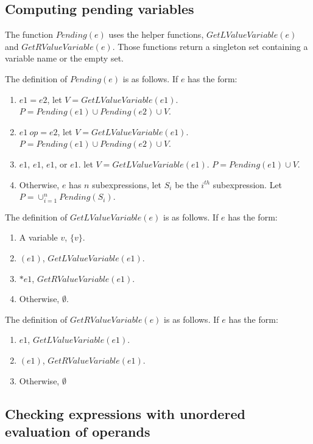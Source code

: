 \subsection{Computing pending variables}

The function $Pending(e)$ uses the helper functions,
$GetLValueVariable(e)$ and $GetRValueVariable(e)$.  Those functions
return a singleton set containing a variable name or the empty set.

The definition of $Pending(e)$ is as follows. If $e$ has the form:
\begin{enumerate}
\item $e1 = e2$, let $V = GetLValueVariable(e1)$.
$P = Pending(e1) \cup Pending(e2) \cup V$.
\item$e1~op= e2$, let $V = GetLValueVariable(e1)$.
$P = Pending(e1) \cup Pending(e2) \cup V$.
\item \code{++}$e1$, \code{--}$e1$, $e1$\code{++}, or $e1$\code{--}.
let $V =  GetLValueVariable(e1)$.  $P = Pending(e1) \cup V$.
\item Otherwise, $e$ has $n$ subexpressions, let $S_i$ be
the $i^{th}$ subexpression.  Let $P = \cup_{i=1}^{n} Pending(S_i)$.
\end{enumerate}

The definition of $GetLValueVariable(e)$ is as follows. If $e$ has the form:
\begin{enumerate}
\item A variable $v$, $\{ v \}$.
\item $(e1)$, $GetLValueVariable(e1)$.
\item $*e1$, $GetRValueVariable(e1)$.
\item Otherwise, $\emptyset$.
\end{enumerate}

The definition of $GetRValueVariable(e)$ is as follows. If $e$ has the form:
\begin{enumerate}
\item \code{&}$e1$, $GetLValueVariable(e1)$.
\item$(e1)$, $GetRValueVariable(e1)$.
\item Otherwise, $\emptyset$
\end{enumerate}

\subsection{Checking expressions with unordered evaluation of operands}


